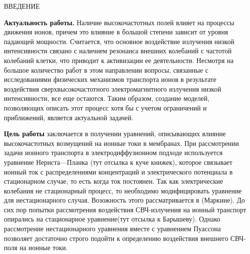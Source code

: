 \begin{center}
    ВВЕДЕНИЕ
\end{center}
\vspace*{1cm}
\textbf{Актуальность работы.} Наличие высокочастотных полей влияет на процессы
    движения ионов, причем это влияние в большой степени зависит от уровня
    падающей мощности. Считается, что основное воздействие излучения низкой
    интенсивности связано с наличием резонанса внешних колебаний с частотой
    колебаний клетки, что приводит к активизации ее деятельности. Несмотря на
    большое количество работ в этом направлении вопросы, связанные с
    исследованиями физических механизмов транспорта ионов в результате
    воздействия сверхвысокочастотного электромагнитного излучения низкой
    интенсивности, все еще остаются. Таким образом, создание моделей,
    позволяющих описать этот процесс хотя бы с учетом ограничений и приближений,
    является актуальной задачей.

\textbf{Цель работы} заключается в получении уравнений, описывающих влияние
    высокочастотных возмущений на ионные токи в мембранах. При рассмотрении
    задачи ионного транспорта в электродиффузионном подходе используется
    уравнение Нернста—Планка (тут отсылка к куче книжек), которое связывает
    ионный ток с распределениями концентраций и электрического потенциала в
    стационарном случае, то есть когда ток постоянен. Так как электрические
    колебания не стационарный процесс, то необходимо модифицировать уравнение
    для нестационарного случая. Возожность этого рассматривается в (Маркине).
    До сих пор попытки рассмотрения воздействия СВЧ-излучения на ионный
    транспорт опирались на стационарное уравнение(тут отсылка к Барышеву).
    Однако рассмотрение нестационарного уравнения вместе с уравнением Пуассона
    позволяет достаточно строго подойти к определению воздействия внешнего
    СВЧ-поля на ионные токи.
